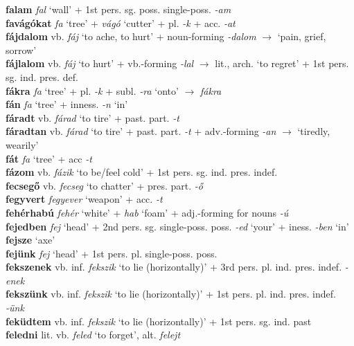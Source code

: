 \documentclass[11pt]{article}
\begin{document}
\textbf{falam} \emph{fal} `wall' + 1st pers. sg. poss. single\hyp{}poss. \emph{-am} \\
\textbf{favágókat} \emph{fa} `tree' + \emph{vágó} `cutter' +
pl. \emph{-k} + acc. \emph{-at} \\
\textbf{fájdalom} vb. \emph{fáj} `to ache, to hurt' +
noun\hyp{}forming \emph{-dalom} $\rightarrow$ `pain, grief, sorrow' \\
\textbf{fájlalom} vb. \emph{fáj} `to hurt' + vb.-forming \emph{-lal}
$\rightarrow$ lit., arch. `to regret' + 1st
pers. sg. ind. pres. def. \\
\textbf{fákra} \emph{fa} `tree' + pl. \emph{-k} + subl. \emph{-ra}
`onto' $\rightarrow$ \emph{fákra} \\
\textbf{fán} \emph{fa} `tree' + inness. \emph{-n} `in' \\
\textbf{fáradt} vb. \emph{fárad} `to tire' + past. part. \emph{-t} \\
\textbf{fáradtan} vb. \emph{fárad} `to tire' + past. part. \emph{-t} +
adv.\hyp{}forming \emph{-an} $\rightarrow$ `tiredly, wearily' \\
\textbf{fát} \emph{fa} `tree' + acc \emph{-t} \\
\textbf{fázom} vb. \emph{fázik} `to be/feel cold' + 1st pers. sg. ind.
pres. indef. \\
\textbf{fecsegő} vb. \emph{fecseg} `to chatter' + pres. part. \emph{-ő} \\
\textbf{fegyvert} \emph{fegyever} `weapon' + acc. \emph{-t} \\
\textbf{fehérhabú} \emph{fehér} `white' + \emph{hab} `foam'
+ adj.\hyp{}forming for nouns \emph{-ú} \\
\textbf{fejedben} \emph{fej} `head' + 2nd
pers. sg. single\hyp{}poss. poss. \emph{-ed} `your' +
iness. \emph{-ben} `in' \\
\textbf{fejsze} `axe' \\
\textbf{fejünk} \emph{fej} `head' + 1st
pers. pl. single\hyp{}poss. poss. \\
\textbf{fekszenek} vb. inf. \emph{fekszik} `to lie (horizontally)' +
3rd pers. pl. ind. pres. indef. \emph{-enek} \\
\textbf{fekszünk} vb. inf. \emph{fekszik} `to lie (horizontally)' +
1st pers. pl. ind. pres. indef. \emph{-ünk} \\
\textbf{feküdtem} vb. inf. \emph{fekszik} `to lie (horizontally)'  +
1st pers. sg. ind. past \\
\textbf{feledni} lit. vb. \emph{feled} `to forget',
alt. \emph{felejt} \\
\end{document}
